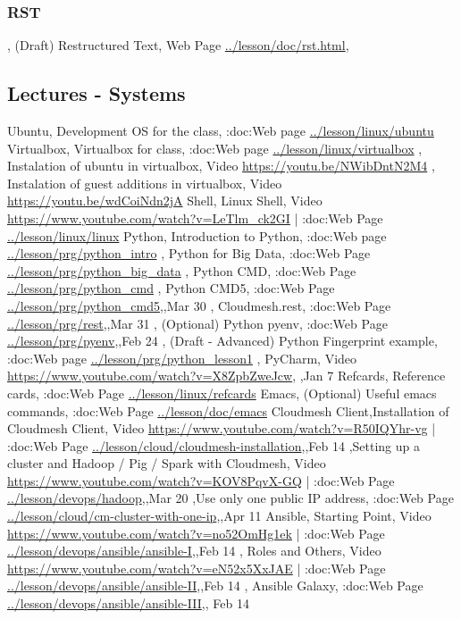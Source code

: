 \documentclass{article}
\begin{document}
\subsubsection{RST}
, (Draft) Restructured Text, Web Page \url{../lesson/doc/rst.html},


\subsection{Lectures - Systems}\label{lectures---systems}

Ubuntu, Development OS for the class, :doc:Web page \url{../lesson/linux/ubuntu}
Virtualbox, Virtualbox for class, :doc:Web page \url{../lesson/linux/virtualbox}
  , Instalation of ubuntu in virtualbox, Video \url{https://youtu.be/NWibDntN2M4}
  , Instalation of guest additions in virtualbox, Video \url{https://youtu.be/wdCoiNdn2jA}
Shell, Linux Shell, Video \url{https://www.youtube.com/watch?v=LeTlm_ck2GI} | :doc:Web Page \url{../lesson/linux/linux}
Python, Introduction to Python, :doc:Web page \url{../lesson/prg/python_intro}
      , Python for Big Data, :doc:Web Page \url{../lesson/prg/python_big_data}
      , Python CMD, :doc:Web Page \url{../lesson/prg/python_cmd}
      , Python CMD5, :doc:Web Page \url{../lesson/prg/python_cmd5},,Mar 30
      , Cloudmesh.rest, :doc:Web Page \url{../lesson/prg/rest},,Mar 31     
      , (Optional) Python pyenv, :doc:Web Page \url{../lesson/prg/pyenv},,Feb 24
      , (Draft - Advanced) Python Fingerprint example, :doc:Web page \url{../lesson/prg/python_lesson1}
      , PyCharm, Video \url{https://www.youtube.com/watch?v=X8ZpbZweJcw},      ,Jan 7
Refcards, Reference cards, :doc:Web Page \url{../lesson/linux/refcards}
Emacs, (Optional) Useful emacs commands, :doc:Web Page \url{../lesson/doc/emacs}
Cloudmesh Client,Installation of Cloudmesh Client, Video \url{https://www.youtube.com/watch?v=R50IQYhr-vg} | :doc:Web Page \url{../lesson/cloud/cloudmesh-installation},,Feb 14
	  ,Setting up a cluster and Hadoop / Pig / Spark with Cloudmesh, Video \url{https://www.youtube.com/watch?v=KOV8PqvX-GQ} | :doc:Web Page \url{../lesson/devops/hadoop},,Mar 20
    ,Use only one public IP address, :doc:Web Page \url{../lesson/cloud/cm-cluster-with-one-ip},,Apr 11
Ansible, Starting Point, Video \url{https://www.youtube.com/watch?v=no52OmHg1ek} | :doc:Web Page \url{../lesson/devops/ansible/ansible-I},,Feb 14
       , Roles and Others, Video \url{https://www.youtube.com/watch?v=eN52x5XxJAE} | :doc:Web Page \url{../lesson/devops/ansible/ansible-II},,Feb 14
       , Ansible Galaxy, :doc:Web Page \url{../lesson/devops/ansible/ansible-III},, Feb 14
\end{document}
